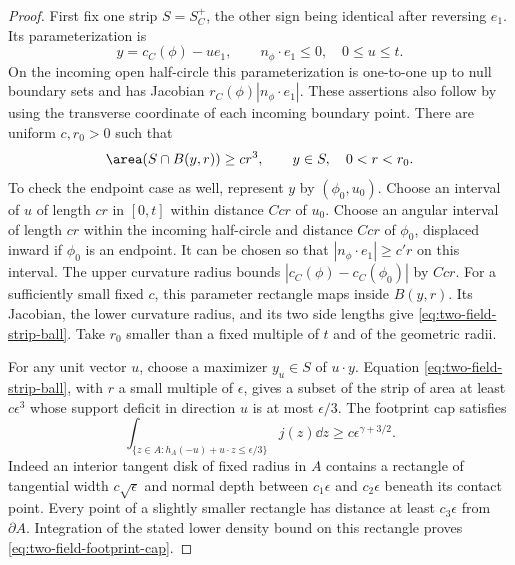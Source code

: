 \begin{proof}
First fix one strip $S=S_C^+$, the other sign being identical after
reversing $e_1$.  Its parameterization is
\[
 y=c_C(\phi)-u e_1,\qquad
          n_\phi\cdot e_1\le0,\quad 0\le u\le t.
\]
On the incoming open half-circle this parameterization is one-to-one
up to null boundary sets and has Jacobian
$r_C(\phi)|n_\phi\cdot e_1|$.  These assertions also follow by
using the transverse coordinate of each incoming boundary point.
There are uniform $c,r_0>0$ such that
\begin{equation}\label{eq:two-field-strip-ball}
             \area(S\cap B(y,r))\ge c r^3,
                     \qquad y\in S,\quad 0<r<r_0.
\end{equation}
To check the endpoint case as well, represent $y$ by $(\phi_0,u_0)$.
Choose an interval of $u$ of length $c r$ in $[0,t]$ within distance
$Ccr$ of $u_0$.  Choose an angular interval of length $c r$ within
the incoming half-circle and distance $Ccr$ of $\phi_0$, displaced
inward if $\phi_0$ is an endpoint.  It can be chosen so that
$|n_\phi\cdot e_1|\ge c' r$ on this interval.  The upper curvature
radius bounds $|c_C(\phi)-c_C(\phi_0)|$ by $Ccr$.
For a sufficiently small fixed $c$, this parameter rectangle maps
inside $B(y,r)$.  Its Jacobian, the lower curvature radius, and its
two side lengths give \eqref{eq:two-field-strip-ball}.  Take $r_0$
smaller than a fixed multiple of $t$ and of the geometric radii.

For any unit vector $u$, choose a maximizer $y_u\in S$ of
$u\cdot y$.  Equation \eqref{eq:two-field-strip-ball}, with
$r$ a small multiple of $\epsilon$, gives a subset of the strip of
area at least $c\epsilon^3$ whose support deficit in direction $u$
is at most $\epsilon/3$.  The footprint cap satisfies
\begin{equation}\label{eq:two-field-footprint-cap}
 \int_{\{z\in A: h_A(-u)+u\cdot z\le\epsilon/3\}}j(z)\dd z
                       \ge c\epsilon^{\gamma+3/2}.
\end{equation}
Indeed an interior tangent disk of fixed radius in $A$ contains a
rectangle of tangential width $c\sqrt\epsilon$ and normal depth
between $c_1\epsilon$ and $c_2\epsilon$ beneath its contact point.
Every point of a slightly smaller rectangle has distance at least
$c_3\epsilon$ from $\partial A$.  Integration of the stated lower
density bound on this rectangle proves
\eqref{eq:two-field-footprint-cap}.


\end{proof}
